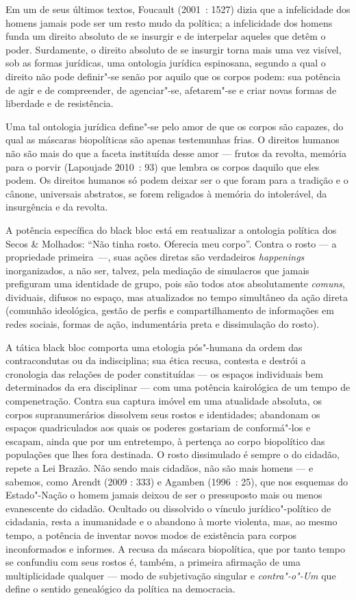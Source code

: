 \asterisc

Em um de seus últimos textos, Foucault (2001~: 1527) dizia que a
infelicidade dos homens jamais pode ser um resto mudo da política; a
infelicidade dos homens funda um direito absoluto de se insurgir e de
interpelar aqueles que detêm o poder. Surdamente, o direito absoluto de
se insurgir torna mais uma vez visível, sob as formas jurídicas, uma
ontologia jurídica espinosana, segundo a qual o direito não pode
definir"-se senão por aquilo que os corpos podem: sua potência de agir e
de compreender, de agenciar"-se, afetarem"-se e criar novas formas de
liberdade e de resistência.

Uma tal ontologia jurídica define"-se pelo amor de que os corpos são
capazes, do qual as máscaras biopolíticas são apenas testemunhas frias.
O direitos humanos não são mais do que a faceta instituída desse amor ---
frutos da revolta, memória para o porvir (Lapoujade 2010~: 93) que
lembra os corpos daquilo que eles podem. Os direitos humanos só podem
deixar ser o que foram para a tradição e o cânone, universais abstratos,
se forem religados à memória do intolerável, da insurgência e da
revolta.

A potência específica do black bloc está em reatualizar a ontologia
política dos Secos \& Molhados: ``Não tinha rosto. Oferecia meu corpo''.
Contra o rosto --- a propriedade primeira~---, suas ações diretas são
verdadeiros \emph{happenings} inorganizados, a não ser, talvez, pela
mediação de simulacros que jamais prefiguram uma identidade de grupo,
pois são todos atos absolutamente \emph{comuns}, dividuais, difusos no
espaço, mas atualizados no tempo simultâneo da ação direta (comunhão
ideológica, gestão de perfis e compartilhamento de informações em redes
sociais, formas de ação, indumentária preta e dissimulação do rosto).

A tática black bloc comporta uma etologia pós"-humana da ordem das
contracondutas ou da indisciplina; sua ética recusa, contesta e destrói
a cronologia das relações de poder constituídas --- os espaços
individuais bem determinados da era disciplinar --- com uma potência
kairológica de um tempo de compenetração. Contra sua captura imóvel em
uma atualidade absoluta, os corpos supranumerários dissolvem seus rostos
e identidades; abandonam os espaços quadriculados aos quais os poderes
gostariam de conformá"-los e escapam, ainda que por um entretempo, à
pertença ao corpo biopolítico das populações que lhes fora destinada. O
rosto dissimulado é sempre o do cidadão, repete a Lei Brazão. Não sendo
mais cidadãos, não são mais homens --- e sabemos, como Arendt (2009 :
333) e Agamben (1996~: 25), que nos esquemas do Estado"-Nação o homem
jamais deixou de ser o pressuposto mais ou menos evanescente do cidadão.
Ocultado ou dissolvido o vínculo jurídico"-político de cidadania, resta a
inumanidade e o abandono à morte violenta, mas, ao mesmo tempo, a
potência de inventar novos modos de existência para corpos inconformados
e informes. A recusa da máscara biopolítica, que por tanto tempo se
confundiu com seus rostos é, também, a primeira afirmação de uma \enlargethispage{\textheight}
multiplicidade qualquer --- modo de subjetivação singular e
\emph{contra"-o"-Um} que define o sentido genealógico da política na
democracia.

